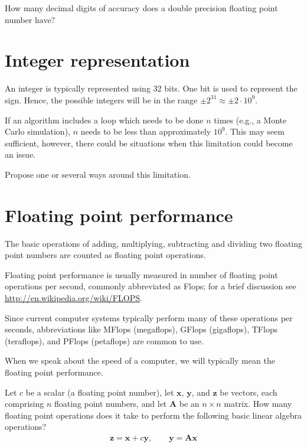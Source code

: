 \begin{ex}
  How many decimal digits of accuracy does a double precision floating point
  number have?
\end{ex}

\section{Integer representation}

An integer is typically represented using 32 bits. One bit is used to represent
the sign. Hence, the possible integers will be in the range $\pm 2^{31} \approx
\pm 2\cdot 10^9$.

If an algorithm includes a loop which needs to be done $n$ times (e.g., a Monte
Carlo simulation), $n$ needs to be less than approximately $10^9$. This may seem
sufficient, however, there could be situations when this limitation could become
an issue.

\begin{ex}
  Propose one or several ways around this limitation.
\end{ex}

\section{Floating point performance}

The basic operations of adding, multiplying, subtracting and dividing two
floating point numbers are counted as floating point operations.

Floating point performance is usually measured in number of floating point
operations per second, commonly abbreviated as Flops; for a brief discussion
see \url{http://en.wikipedia.org/wiki/FLOPS}.

Since current computer systems typically perform many of these operations per
seconds, abbreviations like MFlops (megaflops), GFlops (gigaflops), TFlops
(teraflops), and PFlops (petaflops) are common to use.

When we speak about the speed of a computer, we will typically mean the floating
point performance.

\begin{ex}
  Let $c$ be a scalar (a floating point number), let $\bm x$, $\bm y$, and $\bm
  z$ be vectors, each comprising $n$ floating point numbers, and let $\bm A$ be
  an $n\times n$ matrix. How many floating point operations does it take to
  perform the following basic linear algebra operations?
  \begin{align*}
  \bm z = \bm x + c \bm y, \qquad \bm y = \bm A \bm x
  \end{align*}
\end{ex}

